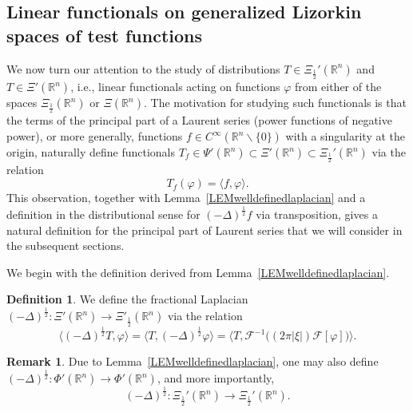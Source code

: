 \documentclass[reqno,11pt]{amsart}
\theoremstyle{definition}
\newtheorem{definition}[theorem]{Definition}
\newtheorem{remark}[theorem]{Remark}
\def\R{\mathbb{R}}
\begin{document}
\subsection{Linear functionals on generalized Lizorkin spaces of test functions}
We now turn our attention to the study of distributions $T\in \Xi_\frac{1}{2}'(\R^n)$ and $T\in \Xi'(\R^n)$, i.e., linear functionals acting on functions $\varphi$ from either of the spaces $\Xi_\frac{1}{2}(\R^n)$ or $\Xi(\R^n)$. The motivation for studying such functionals is that the terms of the principal part of a Laurent series (power functions of negative power), or more generally, functions $f\in C^\infty(\R^n\backslash\{0\})$ with a singularity at the origin, naturally define functionals $T_f\in \Psi'(\R^n)\subset \Xi'(\R^n)\subset \Xi_\frac{1}{2}'(\R^n)$ via the relation
\[
T_f(\varphi) = \langle f,\varphi \rangle.
\]
This observation, together with Lemma~\ref{LEMwelldefinedlaplacian} and a definition in the distributional sense for $(-\Delta)^\frac{1}{2} f$ via transposition, gives a natural definition for the principal part of Laurent series that we will consider in the subsequent sections.

We begin with the definition derived from Lemma~\ref{LEMwelldefinedlaplacian}.

\begin{definition}\label{DEFfractionallap}
	We define the fractional Laplacian $(-\Delta)^{\frac{1}{2}}:\Xi'(\R^n)\to \Xi'_\frac{1}{2}(\R^n)$  via the relation
	\[
	\big\langle (-\Delta)^{\frac{1}{2}} T, \varphi \big\rangle =	\big\langle T, (-\Delta)^{\frac{1}{2}}\varphi \big\rangle  =\langle T, \mathcal{F}^{-1}\big( (2 \pi  |\xi|)\mathcal{F}[\varphi] \big)\rangle.
	\]	
\end{definition}
\begin{remark}\label{REMdefinitionlap12}
	Due to Lemma~\ref{LEMwelldefinedlaplacian}, one may also define $(-\Delta)^{\frac{1}{2}}:\Phi'(\R^n)\to \Phi'(\R^n)$, and more importantly,
	\begin{equation*}
	(-\Delta)^{\frac{1}{2}}:  \Xi_{\frac{1}{2}}'(\mathbb{R}^n) \to \Xi_{\frac{1}{2}}'(\mathbb{R}^n).
	\end{equation*}
\end{remark}
\end{document}
